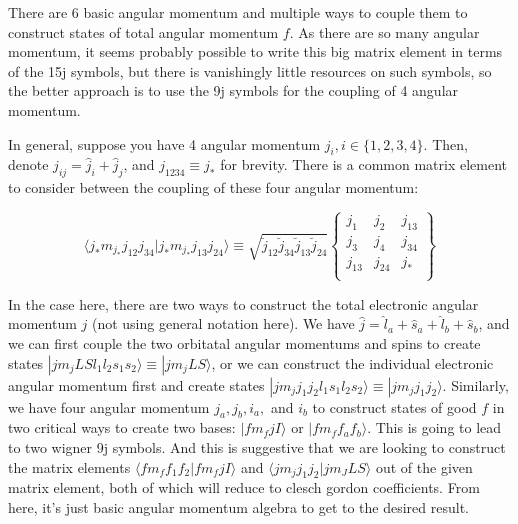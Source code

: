 \documentclass[prl, longbibliography]{revtex4-2}
\begin{document}
There are 6 basic angular momentum and multiple ways to couple them to construct states of total angular momentum $f$. As there are so many angular momentum, it seems probably possible to write this big matrix element in terms of the 15j symbols, but there is vanishingly little resources on such symbols, so the better approach is to use the 9j symbols for the coupling of 4 angular momentum. 

In general, suppose you have 4 angular momentum $j_i, i\in\{1,2,3,4\}$. Then, denote $\hat{j}_{ij}=\hat{j}_i+\hat{j}_j$, and $j_{1234}\equiv j_*$ for brevity. There is a common matrix element to consider between the coupling of these four angular momentum:

\begin{equation}
\langle j_{*} m_{j_{*}} j_{12}j_{34}|j_{*} m_{j_{*}}j_{13}j_{24}\rangle
\equiv\sqrt{\breve{j}_{12}\breve{j}_{34}\breve{j}_{13}\breve{j}_{24}}
\begin{Bmatrix}
j_1 & j_2 & j_{13}\\
j_3 & j_4 & j_{34}\\
j_{13} & j_{24} & j_{*}\\
\end{Bmatrix}
\end{equation} 

In the case here, there are two ways to construct the total electronic angular momentum $j$ (not using general notation here). We have $\hat{j}=\hat{l}_a+\hat{s}_a+\hat{l}_b+\hat{s}_b$, and we can first couple the two orbitatal angular momentums and spins to create states $|jm_j L S l_1 l_2 s_1 s_2 \rangle\equiv|j m_j L S\rangle$, or we can construct the individual electronic angular momentum first and create states $|j m_j j_1 j_2 l_1 s_1 l_2 s_2\rangle\equiv|j m_j j_1 j_2\rangle$. Similarly, we have four angular momentum $j_a, j_b, i_a, $ and $i_b$ to construct states of good $f$ in two critical ways to create two bases: $|f m_f j I\rangle$ or $|f m_f f_a f_b\rangle$. This is going to lead to two wigner 9j symbols. And this is suggestive that we are looking to construct the matrix elements $\langle f m_f f_1 f_2 | f m_f j I\rangle$ and $\langle j m_j j_1 j_2| j m_J L S\rangle$ out of the given matrix element, both of which will reduce to clesch gordon coefficients. From here, it's just basic angular momentum algebra to get to the desired result. 
\end{document}
